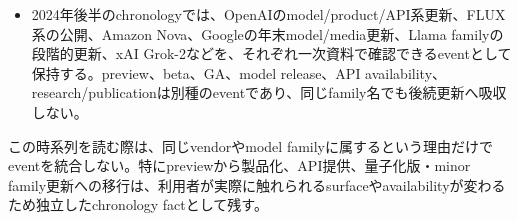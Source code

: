 \begin{itemize}
  \item 2024年後半のchronologyでは、OpenAIのmodel/product/API系更新、FLUX系の公開、Amazon Nova、Googleの年末model/media更新、Llama familyの段階的更新、xAI Grok-2などを、それぞれ一次資料で確認できるeventとして保持する。preview、beta、GA、model release、API availability、research/publicationは別種のeventであり、同じfamily名でも後続更新へ吸収しない。
\end{itemize}
\autocite{src-10b59b402b80,src-1572648d0de9,src-5db07766b472,src-6bbe9721db06,src-99e6401ec31b,src-bc9a95ff1e00,src-c3a08c57269d,src-e92e95daf8e0}

この時系列を読む際は、同じvendorやmodel familyに属するという理由だけでeventを統合しない。特にpreviewから製品化、API提供、量子化版・minor family更新への移行は、利用者が実際に触れられるsurfaceやavailabilityが変わるため独立したchronology factとして残す。\autocite{src-10b59b402b80,src-6bbe9721db06}


